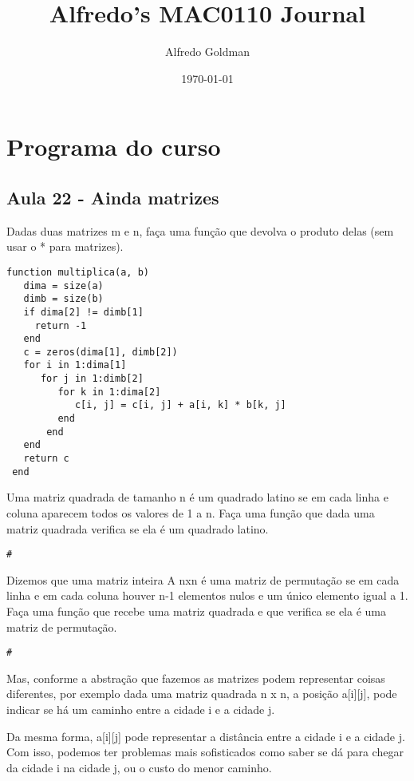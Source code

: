\documentclass[a4paper]{article}
\author{Alfredo Goldman}
\date{\today}
\title{Alfredo's MAC0110 Journal}
\begin{document}
\maketitle

\section{Programa do curso}
\label{sec:org2c5f0a1}
\subsection{Aula 22 - Ainda matrizes}
\label{sec:org9c0ac79}

 Dadas duas matrizes m e n, faça uma função que devolva o
produto delas (sem usar o * para matrizes).

\lstset{language=ein-julia,label= ,caption= ,captionpos=b,numbers=none}
\begin{lstlisting}
function multiplica(a, b)
   dima = size(a)
   dimb = size(b)
   if dima[2] != dimb[1]
     return -1
   end
   c = zeros(dima[1], dimb[2])
   for i in 1:dima[1]
      for j in 1:dimb[2]
         for k in 1:dima[2]
            c[i, j] = c[i, j] + a[i, k] * b[k, j]
         end
       end
   end
   return c
 end

\end{lstlisting}

Uma matriz quadrada de tamanho n é um quadrado latino se em cada linha e coluna
aparecem todos os valores de 1 a n. Faça uma função que dada uma matriz
quadrada verifica se ela é um quadrado latino.

\begin{lstlisting}
#
\end{lstlisting}

Dizemos que uma matriz inteira A nxn  é uma matriz de permutação se em cada linha e em cada
coluna houver n-1 elementos nulos e um único elemento igual a 1. Faça uma função que recebe
uma matriz quadrada e que verifica se ela é uma matriz de permutação.



\begin{lstlisting}
#
\end{lstlisting}

Mas, conforme a abstração que fazemos as matrizes podem representar coisas diferentes,
por exemplo dada uma matriz quadrada n x n, a posição a[i][j], pode indicar se há um caminho
entre a cidade i e a cidade j.

Da mesma forma, a[i][j] pode representar a distância entre a cidade i e a cidade j. Com isso, podemos
ter problemas mais sofisticados como saber se dá para chegar da cidade i na cidade j, ou o custo
do menor caminho.
\end{document}
